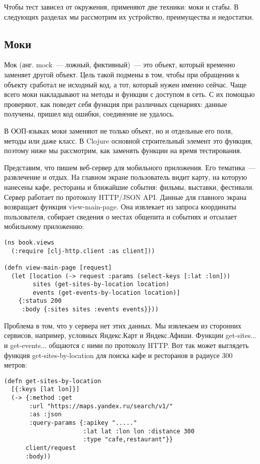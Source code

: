 Чтобы тест зависел от окружения, применяют две техники: моки и стабы. В
следующих разделах мы рассмотрим их устройство, преимущества и недостатки.

\subsection{Моки}

Мок (анг. mock~--- ложный, фиктивный)~--- это объект, который временно заменяет
другой объект. Цель такой подмены в том, чтобы при обращении к объекту сработал
не исходный код, а тот, который нужен именно сейчас. Чаще всего моки накладывают
на методы и функции с доступом в сеть. С их помощью проверяют, как поведет себя
функция при различных сценариях: данные получены, пришел код ошибки, соединение
не удалось.

В ООП-языках моки заменяют не только объект, но и отдельные его поля, методы или
даже класс. В Clojure основной строительный элемент это функция, поэтому ниже мы
рассмотрим, как заменять функции на время тестирования.

Представим, что пишем веб-сервер для мобильного приложения. Его тематика~---
развлечение и отдых. На главном экране пользователь видит карту, на которую
нанесены кафе, рестораны и ближайшие события: фильмы, выставки,
фестивали. Сервер работает по протоколу HTTP/JSON API. Данные для главного
экрана возвращает функция view-main-page. Она извлекает из запроса координаты
пользователя, собирает сведения о местах общепита и событиях и отсылает
мобильному приложению:

\begin{verbatim}
(ns book.views
  (:require [clj-http.client :as client]))

(defn view-main-page [request]
  (let [location (-> request :params (select-keys [:lat :lon]))
        sites (get-sites-by-location location)
        events (get-events-by-location location)]
    {:status 200
     :body {:sites sites :events events}}))
\end{verbatim}

Проблема в том, что у сервера нет этих данных. Мы извлекаем из сторонних
сервисов, например, условных Яндекс.Карт и Яндекс.Афиши. Функции get-sites... и
get-events... общаются с ними по протоколу HTTP. Вот так может выглядеть функция
get-sites-by-location для поиска кафе и ресторанов в радиусе 300 метров:

\begin{verbatim}
(defn get-sites-by-location
  [{:keys [lat lon]}]
  (-> {:method :get
       :url "https://maps.yandex.ru/search/v1/"
       :as :json
       :query-params {:apikey "....."
                      :lat lat :lon lon :distance 300
                      :type "cafe,restaurant"}}
      client/request
      :body))
\end{verbatim}

